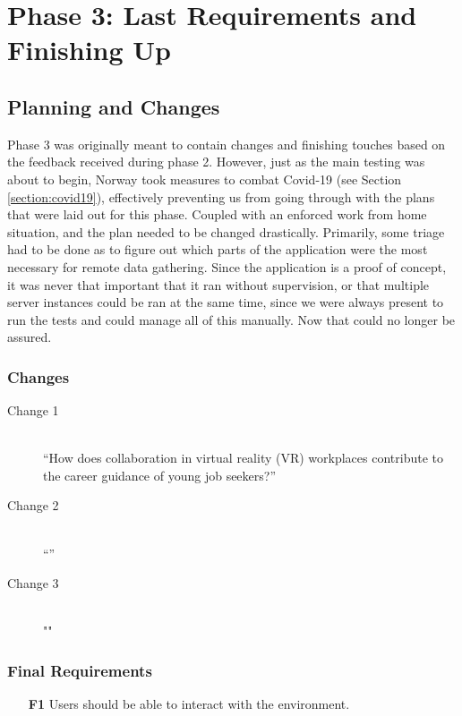 
\chapter{Phase 3: Last Requirements and Finishing Up} \label{chap:7}
\label{chap:phase3}

\section{Planning and Changes}
Phase 3 was originally meant to contain changes and finishing touches based on the feedback received during phase 2. However, just as the main testing was about to begin, Norway took measures to combat Covid-19 (see Section \ref{section:covid19}), effectively preventing us from going through with the plans that were laid out for this phase. Coupled with an enforced work from home situation, and the plan needed to be changed drastically. Primarily, some triage had to be done as to figure out which parts of the application were the most necessary for remote data gathering. Since the application is a proof of concept, it was never that important that it ran without supervision, or that multiple server instances could be ran at the same time, since we were always present to run the tests and could manage all of this manually. Now that could no longer be assured. 

\subsection{Changes}
\begin{description}
    \item [Change 1]\hfill \\
    “How does collaboration in virtual reality (VR) workplaces contribute to the career guidance of young job seekers?” 
    \item [Change 2]\hfill \\
    “”
    \item [Change 3]\hfill \\
    ""
\end{description}

\subsection{Final Requirements}
\begin{enumerate}
  \item [\textbf{F1}] Users should be able to interact with the environment.
\end{enumerate}



